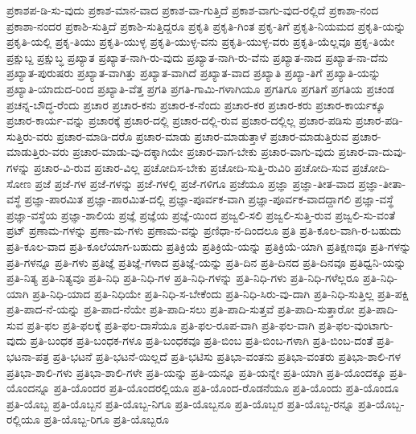 {ಪ್ರಕಾಶಪ-ಡಿ-ಸು-ವುದು
ಪ್ರಕಾಶ-ಮಾನ-ವಾದ
ಪ್ರಕಾಶ-ವಾ-ಗುತ್ತಿದೆ
ಪ್ರಕಾಶ-ವಾಗು-ವುದ-ರಲ್ಲಿದೆ
ಪ್ರಕಾಶಾ-ನಂದ
ಪ್ರಕಾಶಾ-ನಂದರ
ಪ್ರಕಾಶಿ-ಸುತ್ತಿದೆ
ಪ್ರಕಾಶಿ-ಸುತ್ತಿದ್ದರೂ
ಪ್ರಕೃತಿ
ಪ್ರಕೃತಿ-ಗಿಂತ
ಪ್ರಕೃ-ತಿಗೆ
ಪ್ರಕೃತಿ-ನಿಯಮದ
ಪ್ರಕೃತಿ-ಯನ್ನು
ಪ್ರಕೃತಿ-ಯಲ್ಲಿ
ಪ್ರಕೃ-ತಿಯು
ಪ್ರಕೃತಿ-ಯುಳ್ಳ
ಪ್ರಕೃತಿ-ಯುಳ್ಳ-ವನು
ಪ್ರಕೃತಿ-ಯುಳ್ಳ-ವರು
ಪ್ರಕೃತಿ-ಯೆಲ್ಲವೂ
ಪ್ರಕೃ-ತಿಯೇ
ಪ್ರಕ್ಷುಬ್ದ
ಪ್ರಕ್ಷುಬ್ಧ
ಪ್ರಖ್ಯಾತ
ಪ್ರಖ್ಯಾತ-ನಾಗಿ-ರು-ವುದು
ಪ್ರಖ್ಯಾತ-ನಾಗಿ-ರು-ವೆನು
ಪ್ರಖ್ಯಾತ-ನಾದ
ಪ್ರಖ್ಯಾತ-ನಾ-ದೆನು
ಪ್ರಖ್ಯಾತ-ಪುರುಷರು
ಪ್ರಖ್ಯಾತ-ವಾಗಿತ್ತು
ಪ್ರಖ್ಯಾತ-ವಾಗಿದೆ
ಪ್ರಖ್ಯಾತ-ವಾದ
ಪ್ರಖ್ಯಾತಿ
ಪ್ರಖ್ಯಾ-ತಿಗೆ
ಪ್ರಖ್ಯಾತಿ-ಯನ್ನು
ಪ್ರಖ್ಯಾತಿ-ಯಾದುದ-ರಿಂದ
ಪ್ರಖ್ಯಾತಿ-ವೆತ್ತ
ಪ್ರಗತಿ
ಪ್ರಗತಿ-ಗಾಮಿ-ಗಳಾಗಿಯೂ
ಪ್ರಗತಿಗೂ
ಪ್ರಗತಿಗೆ
ಪ್ರಗತಿಯ
ಪ್ರಚಂಡ
ಪ್ರಚನ್ನ-ಬೌದ್ಧ-ರೆಂದು
ಪ್ರಚಾರ
ಪ್ರಚಾರ-ಕನು
ಪ್ರಚಾರ-ಕ-ನೆಂದು
ಪ್ರಚಾರ-ಕರ
ಪ್ರಚಾರ-ಕರು
ಪ್ರಚಾರ-ಕಾರ್ಯಕ್ಕೂ
ಪ್ರಚಾರ-ಕಾರ್ಯ-ವನ್ನು
ಪ್ರಚಾರಕ್ಕೆ
ಪ್ರಚಾರ-ದಲ್ಲಿ
ಪ್ರಚಾರ-ದಲ್ಲಿ-ರುವ
ಪ್ರಚಾರ-ದಲ್ಲಿಲ್ಲ
ಪ್ರಚಾರ-ಪಡಿಸು
ಪ್ರಚಾರ-ಪಡಿ-ಸುತ್ತಿರು-ವರು
ಪ್ರಚಾರ-ಮಾಡಿ-ದರೊ
ಪ್ರಚಾರ-ಮಾಡು
ಪ್ರಚಾರ-ಮಾಡುತ್ತಾಳೆ
ಪ್ರಚಾರ-ಮಾಡುತ್ತಿರುವ
ಪ್ರಚಾರ-ಮಾಡುತ್ತಿರು-ವರು
ಪ್ರಚಾರ-ಮಾಡು-ವು-ದಕ್ಕಾಗಿಯೇ
ಪ್ರಚಾರ-ವಾಗ-ಬೇಕು
ಪ್ರಚಾರ-ವಾಗು-ವುದು
ಪ್ರಚಾರ-ವಾ-ದುವು-ಗಳನ್ನು
ಪ್ರಚಾರ-ವಿ-ರುವ
ಪ್ರಚಾರ-ವಿಲ್ಲ
ಪ್ರಚೋದಿಸ-ಬೇಕು
ಪ್ರಚೋದಿ-ಸುತ್ತಿ-ರುವಿರಿ
ಪ್ರಚೋದಿ-ಸುವ
ಪ್ರಚೋದಿ-ಸೋಣ
ಪ್ರಜೆ
ಪ್ರಜೆ-ಗಳ
ಪ್ರಜೆ-ಗಳನ್ನು
ಪ್ರಜೆ-ಗಳಲ್ಲಿ
ಪ್ರಜೆ-ಗಳಿಗೂ
ಪ್ರಜೆಯೂ
ಪ್ರಜ್ಞಾ
ಪ್ರಜ್ಞಾ-ತೀತ-ವಾದ
ಪ್ರಜ್ಞಾ-ತೀತಾ-ವಸ್ಥೆ
ಪ್ರಜ್ಞಾ-ಪಾರಮಿತ
ಪ್ರಜ್ಞಾ-ಪಾರಮಿತ-ದಲ್ಲಿ
ಪ್ರಜ್ಞಾ-ಪೂರ್ವಕ-ವಾಗಿ
ಪ್ರಜ್ಞಾ-ಪೂರ್ವಕ-ವಾದದ್ದಾಗಲಿ
ಪ್ರಜ್ಞಾ-ವಸ್ಥೆ
ಪ್ರಜ್ಞಾ-ವಸ್ಥೆಯ
ಪ್ರಜ್ಞಾ-ಶಾಲಿಯ
ಪ್ರಜ್ಞೆ
ಪ್ರಜ್ಞೆಯ
ಪ್ರಜ್ಞೆ-ಯಿಂದ
ಪ್ರಜ್ವಲಿ-ಸಲಿ
ಪ್ರಜ್ವಲಿ-ಸುತ್ತಿ-ರುವ
ಪ್ರಜ್ವಲಿ-ಸು-ವಂತೆ
ಪ್ರಟ್
ಪ್ರಣಾಮ-ಗಳನ್ನು
ಪ್ರಣಾ-ಮ-ಗಳು
ಪ್ರಣಾಮ-ವನ್ನು
ಪ್ರಣಿಧಾ-ನ-ದಿಂದಲೂ
ಪ್ರತಿ
ಪ್ರತಿ-ಕೂಲ-ವಾಗಿ-ರ-ಬಹುದು
ಪ್ರತಿ-ಕೂಲ-ವಾದ
ಪ್ರತಿ-ಕೂಲೆಯಾಗ-ಬಹುದು
ಪ್ರತಿಕ್ರಿಯೆ
ಪ್ರತಿಕ್ರಿಯೆ-ಯನ್ನು
ಪ್ರತಿಕ್ರಿಯೆ-ಯಾಗಿ
ಪ್ರತಿಕ್ಷಣವೂ
ಪ್ರತಿ-ಗಳನ್ನು
ಪ್ರತಿ-ಗಳನ್ನೂ
ಪ್ರತಿ-ಗಳು
ಪ್ರತಿಜ್ಞೆ
ಪ್ರತಿಜ್ಞೆ-ಗಳಾದ
ಪ್ರತಿಜ್ಞೆ-ಯನ್ನು
ಪ್ರತಿ-ದಿನ
ಪ್ರತಿ-ದಿನದ
ಪ್ರತಿ-ದಿನವೂ
ಪ್ರತಿಧ್ವನಿ-ಯನ್ನು
ಪ್ರತಿ-ನಿತ್ಯ
ಪ್ರತಿ-ನಿತ್ಯವೂ
ಪ್ರತಿ-ನಿಧಿ
ಪ್ರತಿ-ನಿಧಿ-ಗಳ
ಪ್ರತಿ-ನಿಧಿ-ಗಳನ್ನು
ಪ್ರತಿ-ನಿಧಿ-ಗಳು
ಪ್ರತಿ-ನಿಧಿ-ಗಳೆಲ್ಲರೂ
ಪ್ರತಿ-ನಿಧಿ-ಯಾಗಿ
ಪ್ರತಿ-ನಿಧಿ-ಯಾದ
ಪ್ರತಿ-ನಿಧಿಯೇ
ಪ್ರತಿ-ನಿಧಿ-ಸ-ಬೇಕೆಂದು
ಪ್ರತಿ-ನಿಧಿ-ಸಿರು-ವು-ದಾಗಿ
ಪ್ರತಿ-ನಿಧಿ-ಸುತ್ತಿಲ್ಲ
ಪ್ರತಿ-ಪಕ್ಷಿ
ಪ್ರತಿ-ಪಾದ-ನೆ-ಯನ್ನು
ಪ್ರತಿ-ಪಾದ-ನೆಯೇ
ಪ್ರತಿ-ಪಾದಿ-ಸಲು
ಪ್ರತಿ-ಪಾದಿ-ಸುತ್ತವೆ
ಪ್ರತಿ-ಪಾದಿ-ಸುತ್ತಾರೋ
ಪ್ರತಿ-ಪಾದಿ-ಸುವ
ಪ್ರತಿ-ಫಲ
ಪ್ರತಿ-ಫಲಕ್ಕೆ
ಪ್ರತಿ-ಫಲ-ದಾಸೆಯೂ
ಪ್ರತಿ-ಫಲ-ರೂಪ-ವಾಗಿ
ಪ್ರತಿ-ಫಲ-ವಾಗಿ
ಪ್ರತಿ-ಫಲ-ವುಂಟಾಗು-ವುದು
ಪ್ರತಿ-ಬಂಧಕ
ಪ್ರತಿ-ಬಂಧಕ-ಗಳೂ
ಪ್ರತಿ-ಬಂಧಕವೂ
ಪ್ರತಿ-ಬಿಂಬ
ಪ್ರತಿ-ಬಿಂಬ-ಗಳಾಗಿ
ಪ್ರತಿ-ಬಿಂಬ-ದಂತೆ
ಪ್ರತಿ-ಭಟನಾ-ಪತ್ರ
ಪ್ರತಿ-ಭಟನೆ
ಪ್ರತಿ-ಭಟನೆ-ಯಿಲ್ಲದೆ
ಪ್ರತಿ-ಭಟಿಸು
ಪ್ರತಿಭಾ-ವಂತನು
ಪ್ರತಿಭಾ-ವಂತರು
ಪ್ರತಿಭಾ-ಶಾಲಿ-ಗಳ
ಪ್ರತಿಭಾ-ಶಾಲಿ-ಗಳು
ಪ್ರತಿಭಾ-ಶಾಲಿ-ಗಳೇ
ಪ್ರತಿ-ಯನ್ನು
ಪ್ರತಿ-ಯನ್ನೂ
ಪ್ರತಿ-ಯನ್ನೇ
ಪ್ರತಿ-ಯಾಗಿ
ಪ್ರತಿ-ಯೊಂದಕ್ಕೂ
ಪ್ರತಿ-ಯೊಂದನ್ನೂ
ಪ್ರತಿ-ಯೊಂದರ
ಪ್ರತಿ-ಯೊಂದರಲ್ಲಿಯೂ
ಪ್ರತಿ-ಯೊಂದ-ರೊಡನೆಯೂ
ಪ್ರತಿ-ಯೊಂದು
ಪ್ರತಿ-ಯೊಂದೂ
ಪ್ರತಿ-ಯೊಬ್ಬ
ಪ್ರತಿ-ಯೊಬ್ಬನ
ಪ್ರತಿ-ಯೊಬ್ಬ-ನಿಗೂ
ಪ್ರತಿ-ಯೊಬ್ಬನೂ
ಪ್ರತಿ-ಯೊಬ್ಬರ
ಪ್ರತಿ-ಯೊಬ್ಬ-ರನ್ನೂ
ಪ್ರತಿ-ಯೊಬ್ಬ-ರಲ್ಲಿಯೂ
ಪ್ರತಿ-ಯೊಬ್ಬ-ರಿಗೂ
ಪ್ರತಿ-ಯೊಬ್ಬರೂ
}
